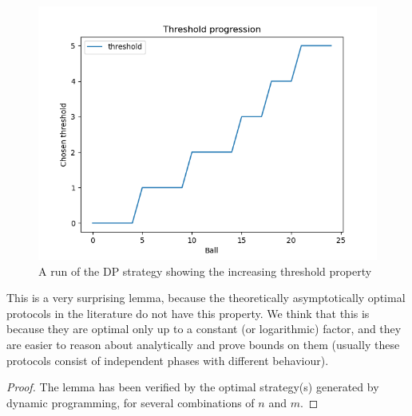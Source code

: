 \begin{figure}[hbt!] \label{dp-increasing-threshold}
    \centering
    \includegraphics[scale=1.0]{Chapter4/Figs/dp_increasing_threshold.png}
    \caption{A run of the DP strategy showing the increasing threshold property}
\end{figure}
This is a very surprising lemma, because the theoretically asymptotically optimal protocols in the literature do not have this property. We think that this is because they are optimal only up to a constant (or logarithmic) factor, and they are easier to reason about analytically and prove bounds on them (usually these protocols consist of independent phases with different behaviour).


\begin{proof}


The lemma has been verified by the optimal strategy(s) generated by dynamic programming, for several combinations of $n$ and $m$. 
\end{proof}

